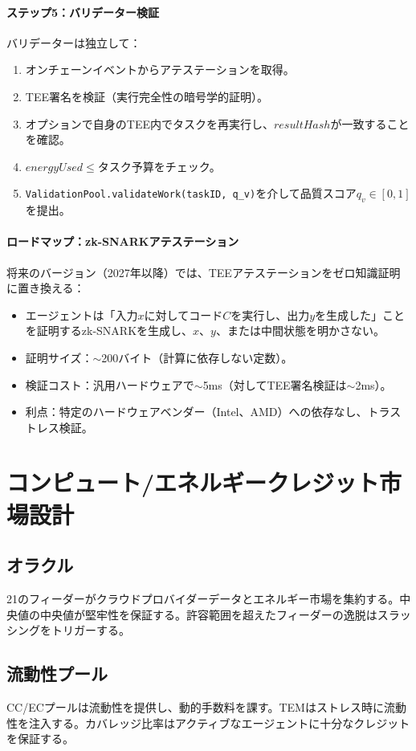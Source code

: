 \documentclass[11pt]{article}
\begin{document}
\paragraph{ステップ5：バリデーター検証}
バリデーターは独立して：
\begin{enumerate}[noitemsep]
  \item オンチェーンイベントからアテステーションを取得。
  \item TEE署名を検証（実行完全性の暗号学的証明）。
  \item オプションで自身のTEE内でタスクを再実行し、$resultHash$が一致することを確認。
  \item $energyUsed \leq$タスク予算をチェック。
  \item \texttt{ValidationPool.validateWork(taskID, q\_v)}を介して品質スコア$q_v \in [0,1]$を提出。
\end{enumerate}

\paragraph{ロードマップ：zk-SNARKアテステーション}
将来のバージョン（2027年以降）では、TEEアテステーションをゼロ知識証明に置き換える：
\begin{itemize}[noitemsep]
  \item エージェントは「入力$x$に対してコード$C$を実行し、出力$y$を生成した」ことを証明するzk-SNARKを生成し、$x$、$y$、または中間状態を明かさない。
  \item 証明サイズ：$\sim$200バイト（計算に依存しない定数）。
  \item 検証コスト：汎用ハードウェアで$\sim$5ms（対してTEE署名検証は$\sim$2ms）。
  \item 利点：特定のハードウェアベンダー（Intel、AMD）への依存なし、トラストレス検証。
\end{itemize}

\section{コンピュート/エネルギークレジット市場設計}
\subsection{オラクル}
21のフィーダーがクラウドプロバイダーデータとエネルギー市場を集約する。中央値の中央値が堅牢性を保証する。許容範囲を超えたフィーダーの逸脱はスラッシングをトリガーする。

\subsection{流動性プール}
CC/ECプールは流動性を提供し、動的手数料を課す。TEMはストレス時に流動性を注入する。カバレッジ比率はアクティブなエージェントに十分なクレジットを保証する。
\end{document}
